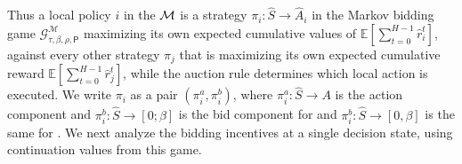 Thus a local policy $i$ in the \momdp $\mathcal{M}$ is a strategy $\pi_i\colon \hat S\to \hat A_i$ in the Markov bidding game $\mathcal{G}^{\mathcal{M}}_{\tau,\beta,\rho,\mathsf{P}}$ maximizing its own expected cumulative values of $\mathbb{E}[\sum_{t=0}^{H-1}\hat r_i^t]$, against every other strategy $\pi_j$ that is maximizing its own expected cumulative reward $\mathbb{E}[\sum_{t=0}^{H-1}\hat r_j^t]$, while the auction rule determines which local action is executed.
We write $\pi_i$ as a pair $(\pi_i^a,\pi_i^b)$, where \(\pi_i^a\colon \hat S\to A\) is the action component and \(\pi_i^b\colon \hat S\to [0;\beta]\) is the bid component  for \poorman and $\pi_i^b\colon \hat S\to [0,\beta]$ is the same for \allpay.
We next analyze the bidding incentives at a single decision state, using continuation values from this game.







